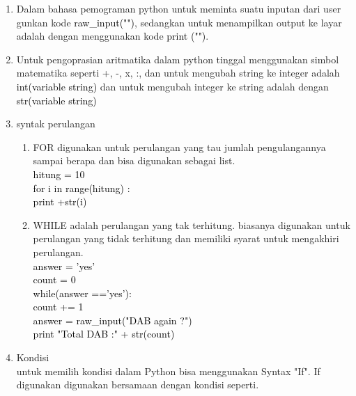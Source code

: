 \documentclass[12pt]{article}
\begin{document}
\begin{enumerate}
			\item Dalam bahasa pemograman python untuk meminta 
			suatu inputan dari user gunkan kode \textcolor{black}{raw\_input("")}, sedangkan untuk menampilkan output ke layar adalah dengan menggunakan kode \textcolor{black}{print ("")}.
			\item Untuk pengoprasian aritmatika dalam python tinggal menggunakan simbol matematika seperti +, -, x, :, dan untuk mengubah string ke integer adalah \textcolor{black}{int(variable string)} dan untuk mengubah integer ke string adalah dengan \textcolor{black}{str(variable string)}
			\item syntak perulangan
				\begin{enumerate}
					\item FOR digunakan untuk perulangan yang tau jumlah pengulangannya sampai berapa dan bisa digunakan sebagai list. \\
					\textcolor{black}{
					hitung = 10 \\
					for i in range(hitung) :\\
						print +str(i)}
						
					\item WHILE adalah perulangan yang tak terhitung. biasanya digunakan untuk perulangan yang tidak terhitung dan memiliki syarat untuk mengakhiri perulangan. \\
					
					\textcolor{black}{
					answer = 'yes'\\
					count = 0		\\			
					while(answer =='yes'):\\
						count += 1\\
						answer = raw\_input("DAB again ?")	\\	
					print "Total DAB :" + str(count)}\\
					
				\end{enumerate}
			\item Kondisi \\
				untuk memilih kondisi dalam Python bisa menggunakan Syntax "If". If digunakan digunakan bersamaan dengan kondisi seperti.
				

\end{enumerate}
\end{document}
